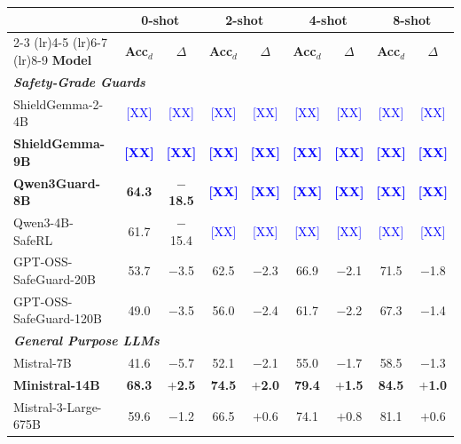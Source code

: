 \begin{table}[t]
\centering
\scriptsize
\begin{tabular}{lcccccccc}
\toprule
 & \multicolumn{2}{c}{\textbf{0-shot}} & \multicolumn{2}{c}{\textbf{2-shot}} & \multicolumn{2}{c}{\textbf{4-shot}} & \multicolumn{2}{c}{\textbf{8-shot}} \\
\cmidrule(lr){2-3} \cmidrule(lr){4-5} \cmidrule(lr){6-7} \cmidrule(lr){8-9}
\textbf{Model} & \textbf{Acc$_d$} & \textbf{$\Delta$} & \textbf{Acc$_d$} & \textbf{$\Delta$} & \textbf{Acc$_d$} & \textbf{$\Delta$} & \textbf{Acc$_d$} & \textbf{$\Delta$} \\
\midrule
\multicolumn{9}{l}{\textbf{\textit{Safety-Grade Guards}}} \\
ShieldGemma-2-4B & \textcolor{blue}{[XX]} & \textcolor{blue}{[XX]} & \textcolor{blue}{[XX]} & \textcolor{blue}{[XX]} & \textcolor{blue}{[XX]} & \textcolor{blue}{[XX]} & \textcolor{blue}{[XX]} & \textcolor{blue}{[XX]} \\
\textbf{ShieldGemma-9B} & \textcolor{blue}{\textbf{[XX]}} & \textcolor{blue}{\textbf{[XX]}} & \textcolor{blue}{\textbf{[XX]}} & \textcolor{blue}{\textbf{[XX]}} & \textcolor{blue}{\textbf{[XX]}} & \textcolor{blue}{\textbf{[XX]}} & \textcolor{blue}{\textbf{[XX]}} & \textcolor{blue}{\textbf{[XX]}} \\
\textbf{Qwen3Guard-8B} & \textbf{64.3} & \textbf{$-$18.5} & \textcolor{blue}{\textbf{[XX]}} & \textcolor{blue}{\textbf{[XX]}} & \textcolor{blue}{\textbf{[XX]}} & \textcolor{blue}{\textbf{[XX]}} & \textcolor{blue}{\textbf{[XX]}} & \textcolor{blue}{\textbf{[XX]}} \\
Qwen3-4B-SafeRL & 61.7 & $-$15.4 & \textcolor{blue}{[XX]} & \textcolor{blue}{[XX]} & \textcolor{blue}{[XX]} & \textcolor{blue}{[XX]} & \textcolor{blue}{[XX]} & \textcolor{blue}{[XX]} \\
GPT-OSS-SafeGuard-20B & 53.7 & $-$3.5 & 62.5 & $-$2.3 & 66.9 & $-$2.1 & 71.5 & $-$1.8 \\
GPT-OSS-SafeGuard-120B & 49.0 & $-$3.5 & 56.0 & $-$2.4 & 61.7 & $-$2.2 & 67.3 & $-$1.4 \\
\midrule[\lightrulewidth]
\multicolumn{9}{l}{\textbf{\textit{General Purpose LLMs}}} \\
Mistral-7B & 41.6 & $-$5.7 & 52.1 & $-$2.1 & 55.0 & $-$1.7 & 58.5 & $-$1.3 \\
\textbf{Ministral-14B} & \textbf{68.3} & \textbf{$+$2.5} & \textbf{74.5} & \textbf{$+$2.0} & \textbf{79.4} & \textbf{$+$1.5} & \textbf{84.5} & \textbf{$+$1.0} \\
Mistral-3-Large-675B & 59.6 & $-$1.2 & 66.5 & $+$0.6 & 74.1 & $+$0.8 & 81.1 & $+$0.6 \\

\end{tabular}
\end{table}
